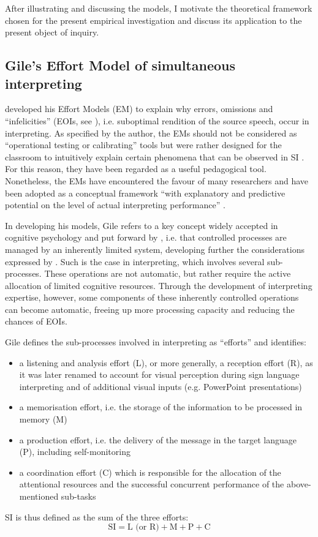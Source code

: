 After illustrating and discussing the models, I motivate the theoretical framework chosen for the present empirical investigation and discuss its application to the present object of inquiry.
\subsection{Gile's Effort Model of simultaneous interpreting} \label{gile}
\citet{gile_partage_1988,gile_conference_1997,gile_testing_1999} developed his Effort Models (EM) to explain why errors, omissions and ``infelicities'' (EOIs, see \citealt{gile_errors_2011,gile_effort_2015}), i.e. suboptimal rendition of the source speech, occur in interpreting. As specified by the author, the EMs should not be considered as ``operational testing or calibrating'' \citep[18]{gile_processing_1991} tools but were rather designed for the classroom to intuitively explain certain phenomena that can be observed in SI \citep[188]{gile_basic_2009}. For this reason, they have been regarded as a useful pedagogical tool. Nonetheless, the EMs have encountered the favour of many researchers and have been adopted as a conceptual framework ``with explanatory and predictive potential on the level of actual interpreting performance'' \citep[2]{gile_testing_1999}.

In developing his models, Gile refers to a key concept widely accepted in cognitive psychology and put forward by \citet{shannon_mathematical_1949}, i.e. that controlled processes are managed by an inherently limited system, developing further the considerations expressed by \citet{kirchhoff_simultaneous_1976}. Such is the case in interpreting, which involves several sub-processes. These operations are not automatic, but rather require the active allocation of limited cognitive resources. Through the development of interpreting expertise, however, some components of these inherently controlled operations can become automatic, freeing up more processing capacity and reducing the chances of EOIs.

Gile defines the sub-processes involved in interpreting as ``efforts'' and identifies:\largerpage

\begin{itemize}
\item a listening and analysis effort (L), or more generally, a reception effort (R), as it was later renamed to account for visual perception during sign language interpreting and of additional visual inputs (e.g. PowerPoint presentations)
\item a memorisation effort, i.e. the storage of the information to be processed in memory (M)
\item a production effort, i.e. the delivery of the message in the target language (P), including self-monitoring
\item a coordination effort (C) which is responsible for the allocation of the attentional resources and the successful concurrent performance of the above-mentioned sub-tasks
\end{itemize}
SI is thus defined as the sum of the three efforts:
\[ \text{SI} = \text{L (or R)} + \text{M} + \text{P} + \text{C}\]

